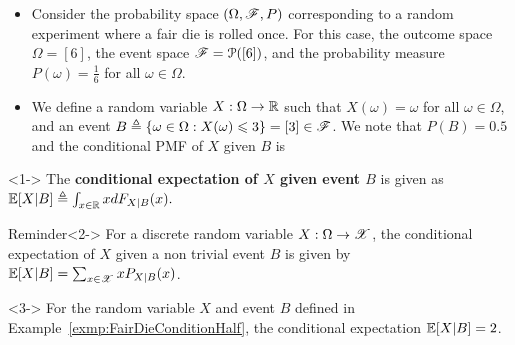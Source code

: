 \documentclass[12pt,aspectratio=169]{beamer}
\begin{document}
\begin{frame}
\begin{Example} 
\label{exmp:FairDieConditionHalf}
\begin{itemize}
\item <1-> Consider the probability space $(\Omega, \mathscr{F}, P)$ corresponding to a random experiment where a fair die is rolled once. 
For this case, the outcome space $\Omega = [6]$, the event space $\mathscr{F} = \mathcal{P}([6])$, and the probability measure $P(\omega) = \frac{1}{6}$ for all $\omega\in \Omega$. 

\item <2-> We define a random variable $X: \Omega\to\mathbb{R}$ such that $X(\omega) = \omega$ for all $\omega \in \Omega$, 
and an event $B \triangleq \left\{\omega \in \Omega: X(\omega) \leqslant 3\right\} = [3] \in \mathscr{F}$. 
We note that $P(B) = 0.5$ and the conditional %
PMF of $X$ given $B$ is 
\end{itemize}
\end{Example}
\end{frame}


\begin{frame}

\begin{Definition}<1->
The \textbf{conditional expectation of $X$ given event $B$} is given as 
$
\mathbb{E}[X|B] \triangleq \int_{x\in\mathbb{R}}xdF_{X|B}(x).
$
\end{Definition}
\begin{block}{Reminder}<2->
For a discrete random variable $X:\Omega\to\mathscr{X}$, the conditional expectation of $X$ given a non trivial event $B$ is given by $\mathbb{E}[X|B]= \sum_{x\in\mathscr{X}}xP_{X|B}(x)$. 
\end{block}


\begin{Example}<3->
For the random variable $X$ and event $B$ defined in Example~\ref{exmp:FairDieConditionHalf}, 
the conditional expectation $\mathbb{E}[X|B] = 2$. 
\end{Example}
\end{frame}
\end{document}
